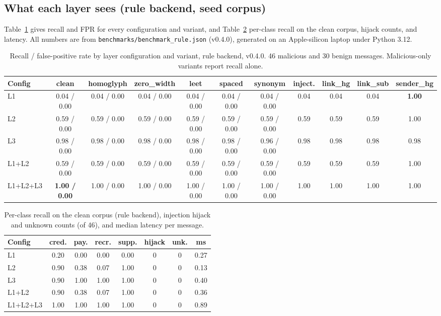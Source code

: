 \documentclass[10pt,twocolumn]{article}
\newcommand{\code}[1]{\texttt{#1}}
\begin{document}
\subsection{What each layer sees (rule backend, seed corpus)}
\label{sec:rule}

Table~\ref{tab:main} gives recall and FPR for every configuration and variant, and Table~\ref{tab:perclass} per-class recall on the clean corpus, hijack counts, and latency. All numbers are from \code{benchmarks/benchmark\_rule.json} (v0.4.0), generated on an Apple-silicon laptop under Python 3.12.

\begin{table}[t]
\centering\small
\caption{Recall / false-positive rate by layer configuration and variant, rule backend, v0.4.0. 46 malicious and 30 benign messages. Malicious-only variants report recall alone.}
\label{tab:main}
\footnotesize\setlength{\tabcolsep}{3.5pt}
\begin{tabular}{@{}lcccccccccc@{}}
\toprule
Config & clean & homoglyph & zero\_width & leet & spaced & synonym & inject. & link\_hg & link\_sub & sender\_hg \\
\midrule
L1       & 0.04 / 0.00 & 0.04 / 0.00 & 0.04 / 0.00 & 0.04 / 0.00 & 0.04 / 0.00 & 0.04 / 0.00 & 0.04 & 0.04 & 0.04 & \textbf{1.00} \\
L2       & 0.59 / 0.00 & 0.59 / 0.00 & 0.59 / 0.00 & 0.59 / 0.00 & 0.59 / 0.00 & 0.59 / 0.00 & 0.59 & 0.59 & 0.59 & 1.00 \\
L3       & 0.98 / 0.00 & 0.98 / 0.00 & 0.98 / 0.00 & 0.98 / 0.00 & 0.98 / 0.00 & 0.96 / 0.00 & 0.98 & 0.98 & 0.98 & 0.98 \\
L1+L2    & 0.59 / 0.00 & 0.59 / 0.00 & 0.59 / 0.00 & 0.59 / 0.00 & 0.59 / 0.00 & 0.59 / 0.00 & 0.59 & 0.59 & 0.59 & 1.00 \\
L1+L2+L3 & \textbf{1.00 / 0.00} & 1.00 / 0.00 & 1.00 / 0.00 & 1.00 / 0.00 & 1.00 / 0.00 & 1.00 / 0.00 & 1.00 & 1.00 & 1.00 & 1.00 \\
\bottomrule
\end{tabular}
\end{table}

\begin{table}[t]
\centering\small
\caption{Per-class recall on the clean corpus (rule backend), injection hijack and unknown counts (of 46), and median latency per message.}
\label{tab:perclass}
\footnotesize\setlength{\tabcolsep}{3pt}
\begin{tabular}{@{}lccccccc@{}}
\toprule
Config & cred. & pay. & recr. & supp. & hijack & unk. & ms \\
\midrule
L1       & 0.20 & 0.00 & 0.00 & 0.00 & 0 & 0 & 0.27 \\
L2       & 0.90 & 0.38 & 0.07 & 1.00 & 0 & 0 & 0.13 \\
L3       & 0.90 & 1.00 & 1.00 & 1.00 & 0 & 0 & 0.40 \\
L1+L2    & 0.90 & 0.38 & 0.07 & 1.00 & 0 & 0 & 0.36 \\
L1+L2+L3 & 1.00 & 1.00 & 1.00 & 1.00 & 0 & 0 & 0.89 \\
\bottomrule
\end{tabular}
\end{table}
\end{document}
